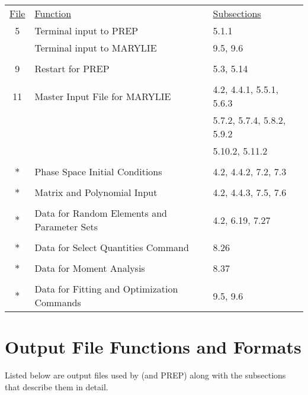 \begin{center}
\begin{tabular}{cll}
\underline{File} & \underline{Function} & \underline{Subsections}\\
           5  &       Terminal input to PREP         &     5.1.1\\
              &       Terminal input to MARYLIE      &     9.5, 9.6\\
\vspace{-3mm}& &\\
           9   &      Restart for PREP                &    5.3, 5.14\\
\vspace{-3mm}& &\\
       11   &      Master Input File for MARYLIE   &    4.2, 4.4.1, 5.5.1, 5.6.3\\
             &                                    & 5.7.2, 5.7.4, 5.8.2, 5.9.2\\
             &                                    & 5.10.2, 5.11.2\\
\vspace{-3mm}& &\\
     $\ast$    &     Phase Space Initial Conditions   &   4.2, 4.4.2, 7.2, 7.3 \\
\vspace{-3mm}& &\\
     $\ast$    &     Matrix and Polynomial Input       &  4.2, 4.4.3, 7.5, 7.6 \\
\vspace{-3mm}& &\\
     $\ast$   &      Data for Random Elements and  Parameter Sets    &  4.2, 6.19, 7.27\\
\vspace{-3mm}& &\\
          $\ast$    &     Data for Select Quantities Command & 8.26\\
\vspace{-3mm}& &\\
          $\ast$    &     Data for Moment Analysis & 8.37\\
\vspace{-3mm}& &\\
           $\ast$    &     Data for Fitting and Optimization Commands  & 9.5, 9.6\\
\end{tabular}
\end{center}

\newpage
\section{Output File Functions and Formats}   
     Listed below are output files used by \Mary (and PREP) along with
the subsections that describe them in detail.

